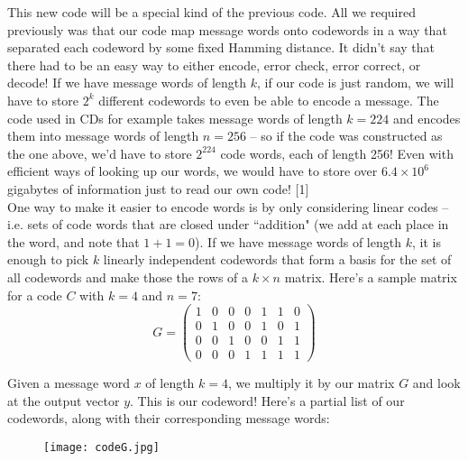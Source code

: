 
This new code will be a special kind of the previous code. All we required previously was that our code map message words onto codewords in a way that separated each codeword by some fixed Hamming distance. It didn't say that there had to be an easy way to either encode, error check, error correct, or decode! If we have message words of length $k$, if our code is just random, we will have to store $2^k$ different codewords to even be able to encode a message. The code used in CDs for example takes message words of length $k=224$ and encodes them into message words of length $n=256$ -- so if the code was constructed as the one above, we'd have to store $2^{224}$ code words, each of length 256! Even with efficient ways of looking up our words, we would have to store over $6.4\times 10^6$ gigabytes of information just to read our own code! [1] \\

One way to make it easier to encode words is by only considering linear codes -- i.e. sets of code words that are closed under ``addition" (we add at each place in the word, and note that $1+1=0$). If we have message words of length $k$, it is enough to pick $k$ linearly independent codewords that form a basis for the set of all codewords and make those the rows of a $k\times n$ matrix. Here's a sample matrix for a code $C$ with $k=4$ and $n=7$:
\[
G= \begin{pmatrix} 1 & 0 & 0 & 0 & 1 & 1 & 0 \\ 0 & 1 & 0 & 0 & 1 & 0 & 1 \\ 0 & 0 & 1 & 0 & 0 & 1 & 1 \\ 0 & 0 & 0 & 1 & 1 & 1 & 1 \end{pmatrix}
\]

Given a message word $x$ of length $k=4$, we multiply it by our matrix $G$ and look at the output vector $y$. This is our codeword! Here's a partial list of our codewords, along with their corresponding message words:

\begin{figure}[H]
   \centering
   \texttt{[image: codeG.jpg]} 
\end{figure}

